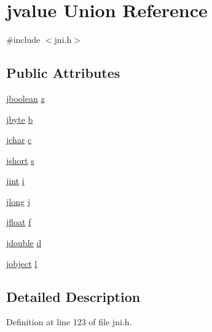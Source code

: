 \hypertarget{unionjvalue}{\section{jvalue Union Reference}
\label{unionjvalue}
}


{\ttfamily \#include $<$jni.\-h$>$}

\subsection*{Public Attributes}
\begin{DoxyCompactItemize}
\item 
\hyperlink{jni_8h_a3e597066bbafe45e3d729fc1f4f9829f}{jboolean} \hyperlink{unionjvalue_a05012aacf042aed275b99751d3498db6}{z}
\item 
\hyperlink{jni_8h_acb5e31bb111c99042a7459568cab51bc}{jbyte} \hyperlink{unionjvalue_aefa3b88020503b525905fb882c70551d}{b}
\item 
\hyperlink{jni_8h_ae1d44de84f1089a96983c1ffe4982405}{jchar} \hyperlink{unionjvalue_a04e0384cd7775069b0f2b7d0e0ea39c6}{c}
\item 
\hyperlink{jni_8h_ae579a9c82feef40bb9fc48810e152cf6}{jshort} \hyperlink{unionjvalue_a14b30561ffa7cec1d3816fbcfad9cc37}{s}
\item 
\hyperlink{jni_8h_ad6e59d976b9b5bae7a19d746bd2879c1}{jint} \hyperlink{unionjvalue_a17b6765ac8cb7d522e35073745faebe2}{i}
\item 
\hyperlink{jni_8h_ab9b0f43bf72fd26315ed0165966ddb25}{jlong} \hyperlink{unionjvalue_a689d7d90535c58396fea6fe01eae4a16}{j}
\item 
\hyperlink{jni_8h_a5d393cee6f500e76ac60e7e29279bf17}{jfloat} \hyperlink{unionjvalue_ad32f5996f5d0f5fb93fb38ef83a74eb0}{f}
\item 
\hyperlink{jni_8h_a4dbf307878725eebfb852c2800a951fa}{jdouble} \hyperlink{unionjvalue_a59e182c81993c48325831f2fa8dc19ca}{d}
\item 
\hyperlink{jni_8h_a24647d2a2f02c39f6338c2c6ce4c1004}{jobject} \hyperlink{unionjvalue_a39641ea6a8d530886f307f23eabcc2c8}{l}
\end{DoxyCompactItemize}


\subsection{Detailed Description}


Definition at line 123 of file jni.\-h.



